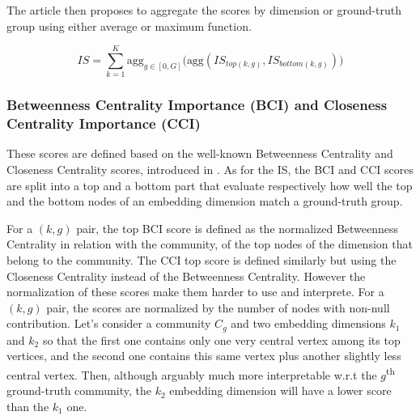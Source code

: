The article then proposes to aggregate the scores by dimension or ground-truth group using either average or maximum function. %

\begin{equation}
    IS = \sum_{k=1}^K \text{agg}_{g \in [0, G]}\big(\text{agg}(IS_{top(k,g)}, IS_{bottom(k,g)})\big)
\end{equation}

\subsubsection{Betweenness Centrality Importance (BCI) and Closeness Centrality Importance (CCI)}\label{subsec:bci_cci_introduction}
These scores are defined based on the well-known Betweenness Centrality and Closeness Centrality scores, introduced in \cite{bloch2023centrality}.  As for the IS, the BCI and CCI scores are split into a top and a bottom part that evaluate respectively how well the top and the bottom nodes of an embedding dimension match a ground-truth group.

For a $(k, g)$ pair, the top BCI score is defined as the normalized Betweenness Centrality in relation with the community, of the top nodes of the dimension that belong to the community. The CCI top score is defined similarly but using the Closeness Centrality instead of the Betweenness Centrality.
However the normalization of these scores make them harder to use and interprete. For a $(k, g)$ pair, the scores are normalized by the number of nodes with non-null contribution. Let's consider a community $C_g$ and two embedding dimensions $k_1$ and $k_2$ so that the first one contains only one very central vertex among its top vertices, and the second one contains this same vertex plus another slightly less central vertex. Then, although arguably much more interpretable w.r.t the $g$\textsuperscript{th} ground-truth community, the $k_2$ embedding dimension will have a lower score than the $k_1$ one.

